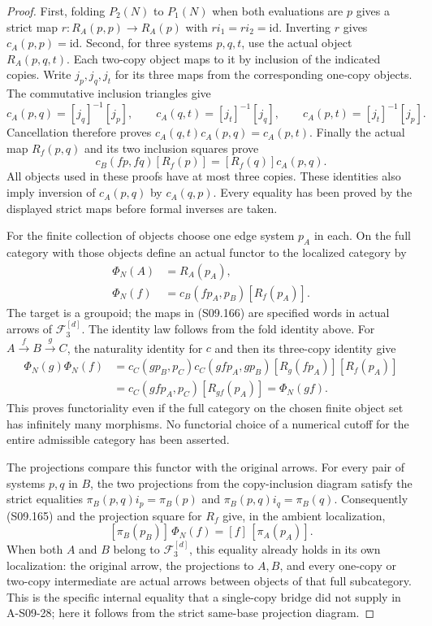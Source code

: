 \begin{proof}
First, folding $P_2(N)$ to $P_1(N)$ when both evaluations
are $p$ gives a strict map $r:R_A(p,p)\to R_A(p)$ with
$r i_1=r i_2=\mathrm{id}$. Inverting $r$ gives
$c_A(p,p)=\mathrm{id}$.
Second, for three systems $p,q,t$, use the actual object
$R_A(p,q,t)$. Each two-copy object maps to it by inclusion
of the indicated copies. Write $j_p,j_q,j_t$ for its
three maps from the corresponding one-copy objects.
The commutative inclusion triangles give
\[
 c_A(p,q)=[j_q]^{-1}[j_p],\qquad
 c_A(q,t)=[j_t]^{-1}[j_q],\qquad
 c_A(p,t)=[j_t]^{-1}[j_p].
\]
Cancellation therefore proves
$c_A(q,t)c_A(p,q)=c_A(p,t)$.
Finally the actual map $R_f(p,q)$ and its two inclusion
squares prove
\[
 c_B(fp,fq)[R_f(p)]
                       =[R_f(q)]c_A(p,q).
\]
All objects used in these proofs have at most three copies.
These identities also imply inversion of $c_A(p,q)$ by
$c_A(q,p)$. Every equality has been proved by the displayed
strict maps before formal inverses are taken.

For the finite collection of objects choose one edge system
$p_A$ in each. On the full category with those objects define
an actual functor to the localized category by
\[
 \begin{split}
 \Phi_N(A)&=R_A(p_A),\\
 \Phi_N(f)&=c_B(fp_A,p_B)[R_f(p_A)].
 \end{split}
 \tag{S09.166}
\]
The target is a groupoid; the maps in (S09.166) are specified
words in actual arrows of $\mathcal F_3^{[d]}$.
The identity law follows from the fold identity above.
For $A\xrightarrow f B\xrightarrow g C$, the naturality
identity for $c$ and then its three-copy identity give
\[
 \begin{split}
 \Phi_N(g)\Phi_N(f)
 &=c_C(gp_B,p_C)c_C(gfp_A,gp_B)
                         [R_g(fp_A)][R_f(p_A)]\\
 &=c_C(gfp_A,p_C)[R_{gf}(p_A)]
 =\Phi_N(gf).
 \end{split}
\]
This proves functoriality even if the full category on the
chosen finite object set has infinitely many morphisms.
No functorial choice of a numerical cutoff for the entire
admissible category has been asserted.

The projections compare this functor with the original arrows.
For every pair of systems $p,q$ in $B$, the two projections
from the copy-inclusion diagram satisfy the strict equalities
$\pi_B(p,q)i_p=\pi_B(p)$ and
$\pi_B(p,q)i_q=\pi_B(q)$.
Consequently (S09.165) and the projection square for $R_f$
give, in the ambient localization,
\[
 [\pi_B(p_B)]\,\Phi_N(f)=[f]\,[\pi_A(p_A)].
 \tag{S09.167}
\]
When both $A$ and $B$ belong to $\mathcal F_3^{[d]}$,
this equality already holds in its own localization:
the original arrow, the projections to $A,B$, and every
one-copy or two-copy intermediate are actual arrows between
objects of that full subcategory. This is the specific
internal equality that a single-copy bridge did not supply
in A-S09-28; here it follows from the strict same-base
projection diagram.


\end{proof}

